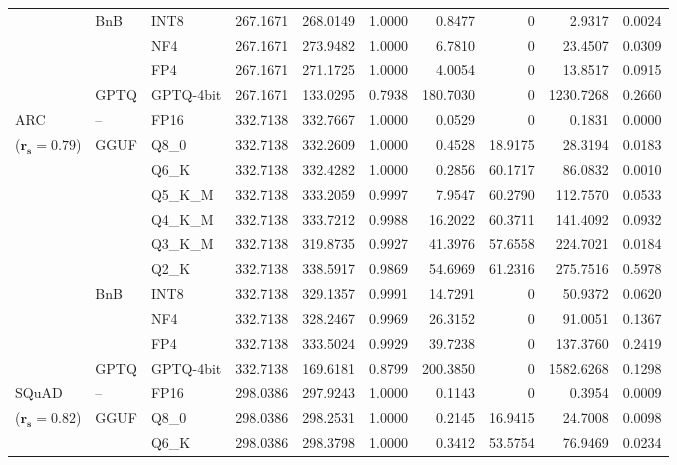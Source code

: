 \begin{longtable}{ll l rrrrrrr}
 & BnB & INT8 & 267.1671 & 268.0149 & 1.0000 & 0.8477 & \cellcolor{cyan!12} $0$ & 2.9317 & 0.0024 \\
 &  & NF4 & 267.1671 & 273.9482 & 1.0000 & 6.7810 & \cellcolor{cyan!12} $0$ & 23.4507 & 0.0309 \\
 &  & FP4 & 267.1671 & 271.1725 & 1.0000 & 4.0054 & \cellcolor{cyan!12} $0$ & 13.8517 & 0.0915 \\
 & GPTQ & GPTQ-4bit & 267.1671 & 133.0295 & \cellcolor{red!35} 0.7938 & \cellcolor{red!35} 180.7030 & \cellcolor{cyan!12} $0$ & \cellcolor{red!35} 1230.7268 & \cellcolor{red!35} 0.2660 \\
\midrule
ARC & -- & FP16 & 332.7138 & 332.7667 & 1.0000 & 0.0529 & \cellcolor{cyan!12} $0$ & 0.1831 & 0.0000 \\
{\small ($\mathbf{r_s{=}0.79}$)} & GGUF & Q8\_0 & 332.7138 & 332.2609 & 1.0000 & 0.4528 & 18.9175 & 28.3194 & 0.0183 \\
 &  & Q6\_K & 332.7138 & 332.4282 & 1.0000 & 0.2856 & 60.1717 & 86.0832 & 0.0010 \\
 &  & Q5\_K\_M & 332.7138 & 333.2059 & 0.9997 & 7.9547 & 60.2790 & 112.7570 & 0.0533 \\
 &  & Q4\_K\_M & 332.7138 & 333.7212 & 0.9988 & 16.2022 & 60.3711 & 141.4092 & 0.0932 \\
 &  & Q3\_K\_M & 332.7138 & 319.8735 & 0.9927 & 41.3976 & 57.6558 & 224.7021 & 0.0184 \\
 &  & Q2\_K & 332.7138 & 338.5917 & 0.9869 & 54.6969 & 61.2316 & 275.7516 & 0.5978 \\
 & BnB & INT8 & 332.7138 & 329.1357 & 0.9991 & 14.7291 & \cellcolor{cyan!12} $0$ & 50.9372 & 0.0620 \\
 &  & NF4 & 332.7138 & 328.2467 & 0.9969 & 26.3152 & \cellcolor{cyan!12} $0$ & 91.0051 & 0.1367 \\
 &  & FP4 & 332.7138 & 333.5024 & 0.9929 & 39.7238 & \cellcolor{cyan!12} $0$ & 137.3760 & 0.2419 \\
 & GPTQ & GPTQ-4bit & 332.7138 & 169.6181 & \cellcolor{red!18} 0.8799 & \cellcolor{red!18} 200.3850 & \cellcolor{cyan!12} $0$ & \cellcolor{red!18} 1582.6268 & \cellcolor{red!18} 0.1298 \\
\midrule
SQuAD & -- & FP16 & 298.0386 & 297.9243 & 1.0000 & 0.1143 & \cellcolor{cyan!12} $0$ & 0.3954 & 0.0009 \\
{\small ($\mathbf{r_s{=}0.82}$)} & GGUF & Q8\_0 & 298.0386 & 298.2531 & 1.0000 & 0.2145 & 16.9415 & 24.7008 & 0.0098 \\
 &  & Q6\_K & 298.0386 & 298.3798 & 1.0000 & 0.3412 & 53.5754 & 76.9469 & 0.0234 \\

\end{longtable}
